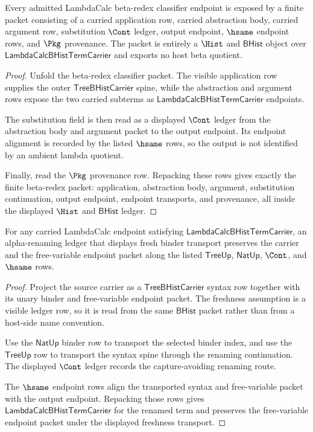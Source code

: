 \begin{theorem}
\label{thm:lambdacalc-beta-redex-packet-exactness}
Every admitted LambdaCalc beta-redex classifier endpoint is exposed by a finite
packet consisting of a carried application row, carried abstraction body,
carried argument row, substitution $\Cont$ ledger, output endpoint,
$\hsame$ endpoint rows, and $\Pkg$ provenance. The packet is entirely a
$\Hist$ and $\mathsf{BHist}$ object over
$\mathsf{LambdaCalcBHistTermCarrier}$ and exports no host beta quotient.
\end{theorem}
\begin{proof}
Unfold the beta-redex classifier packet. The visible application row supplies
the outer $\mathsf{TreeBHistCarrier}$ spine, while the abstraction and argument
rows expose the two carried subterms as
$\mathsf{LambdaCalcBHistTermCarrier}$ endpoints.

The substitution field is then read as a displayed $\Cont$ ledger from the
abstraction body and argument packet to the output endpoint. Its endpoint
alignment is recorded by the listed $\hsame$ rows, so the output is not
identified by an ambient lambda quotient.

Finally, read the $\Pkg$ provenance row. Repacking these rows gives exactly the
finite beta-redex packet: application, abstraction body, argument,
substitution continuation, output endpoint, endpoint transports, and
provenance, all inside the displayed $\Hist$ and $\mathsf{BHist}$ ledger.
\end{proof}

\begin{theorem}
\label{thm:lambdacalc-alpha-renaming-freshness-transport}
For any carried LambdaCalc endpoint satisfying
$\mathsf{LambdaCalcBHistTermCarrier}$, an alpha-renaming ledger that displays
fresh binder transport preserves the carrier and the free-variable endpoint
packet along the listed $\mathsf{TreeUp}$, $\mathsf{NatUp}$, $\Cont$, and
$\hsame$ rows.
\end{theorem}
\begin{proof}
Project the source carrier as a $\mathsf{TreeBHistCarrier}$ syntax row together
with its unary binder and free-variable endpoint packet. The freshness
assumption is a visible ledger row, so it is read from the same
$\mathsf{BHist}$ packet rather than from a host-side name convention.

Use the $\mathsf{NatUp}$ binder row to transport the selected binder index, and
use the $\mathsf{TreeUp}$ row to transport the syntax spine through the
renaming continuation. The displayed $\Cont$ ledger records the capture-avoiding
renaming route.

The $\hsame$ endpoint rows align the transported syntax and free-variable
packet with the output endpoint. Repacking those rows gives
$\mathsf{LambdaCalcBHistTermCarrier}$ for the renamed term and preserves the
free-variable endpoint packet under the displayed freshness transport.
\end{proof}

